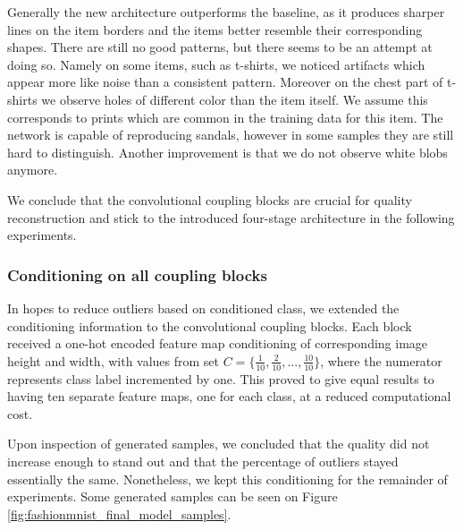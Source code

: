 \documentclass[final]{cvpr}
\begin{document}
Generally the new architecture outperforms the baseline, as it produces sharper lines on the item borders and the items better resemble their corresponding shapes. There are still no good patterns, but there seems to be an attempt at doing so. Namely on some items, such as t-shirts, we noticed artifacts which appear more like noise than a consistent pattern. Moreover on the chest part of t-shirts we observe holes of different color than the item itself. We assume this corresponds to prints which are common in the training data for this item. The network is capable of reproducing sandals, however in some samples they are still hard to distinguish. Another improvement is that we do not observe white blobs anymore.

We conclude that the convolutional coupling blocks are crucial for quality reconstruction and stick to the introduced four-stage architecture in the following experiments.

\subsubsection{Conditioning on all coupling blocks}\label{sec:experiment_condition_on_all_ccs}
In hopes to reduce outliers based on conditioned class, we extended the conditioning information to the convolutional coupling blocks. Each block received a one-hot encoded feature map conditioning of corresponding image height and width, with values from set $C = \{\frac{1}{10}, \frac{2}{10}, ..., \frac{10}{10}\}$, where the numerator represents class label incremented by one. This proved to give equal results to having ten separate feature maps, one for each class, at a reduced computational cost.

Upon inspection of generated samples, we concluded that the quality did not increase enough to stand out and that the percentage of outliers stayed essentially the same. Nonetheless, we kept this conditioning for the remainder of experiments. Some generated samples can be seen on Figure \ref{fig:fashionmnist_final_model_samples}.
\end{document}
